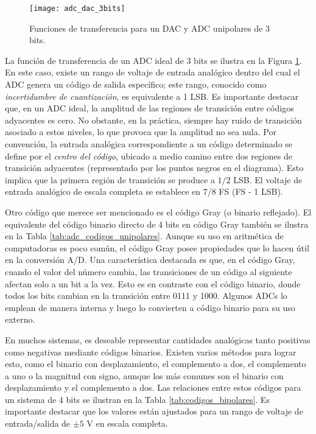     \begin{figure}[!h]
      \centering
      \texttt{[image: adc\_dac\_3bits]}
      \caption{Funciones de transferencia para un DAC y ADC unipolares de 3 bits.}
      \label{fig:adc_dac_3bits}
    \end{figure}

    La función de transferencia de un ADC ideal de 3 bits se ilustra en la Figura \ref{fig:adc_dac_3bits}. En este caso, existe un rango de voltaje de entrada analógico dentro del cual el ADC genera un código de salida específico; este rango, conocido como \textit{incertidumbre de cuantización}, es equivalente a 1 LSB. Es importante destacar que, en un ADC ideal, la amplitud de las regiones de transición entre códigos adyacentes es cero. No obstante, en la práctica, siempre hay ruido de transición asociado a estos niveles, lo que provoca que la amplitud no sea nula. Por convención, la entrada analógica correspondiente a un código determinado se define por el \textit{centro del código}, ubicado a medio camino entre dos regiones de transición adyacentes (representado por los puntos negros en el diagrama). Esto implica que la primera región de transición se produce a $1/2$ LSB. El voltaje de entrada analógico de escala completa se establece en 7/8 FS (FS - 1 LSB).

    Otro código que merece ser mencionado es el código Gray (o binario reflejado). El equivalente del código binario directo de 4 bits en código Gray también se ilustra en la Tabla \ref{tab:adc_codigos_unipolares}. Aunque su uso en aritmética de computadoras es poco común, el código Gray posee propiedades que lo hacen útil en la conversión A/D. Una característica destacada es que, en el código Gray, cuando el valor del número cambia, las transiciones de un código al siguiente afectan solo a un bit a la vez. Esto es en contraste con el código binario, donde todos los bits cambian en la transición entre 0111 y 1000. Algunos ADCs lo emplean de manera interna y luego lo convierten a código binario para su uso externo.

    En muchos sistemas, es deseable representar cantidades analógicas tanto positivas como negativas mediante códigos binarios. Existen varios métodos para lograr esto, como el binario con desplazamiento, el complemento a dos, el complemento a uno o la magnitud con signo, aunque los más comunes son el binario con desplazamiento y el complemento a dos. Las relaciones entre estos códigos para un sistema de 4 bits se ilustran en la Tabla \ref{tab:codigos_bipolares}. Es importante destacar que los valores están ajustados para un rango de voltaje de entrada/salida de $\pm 5$ V en escala completa.

